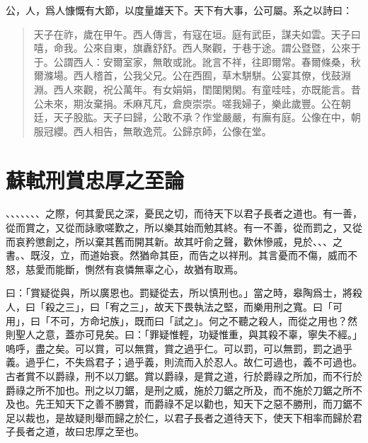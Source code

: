 公，人，爲人慷慨有大節，以度量雄天下。天下有大事，公可屬。系之以詩曰：

\begin{quote}
    天子在祚，歲在甲午。西人傳言，有寇在垣。庭有武臣，謀夫如雲。天子曰嘻，命我。公來自東，旗纛舒舒。西人聚觀，于巷于途。謂公暨暨，公來于于。公謂西人：安爾室家，無敢或訛。訛言不祥，往即爾常。春爾條桑，秋爾滌場。西人稽首，公我父兄。公在西囿，草木駢駢。公宴其僚，伐鼓淵淵。西人來觀，祝公萬年。有女娟娟，閨闥閑閑。有童哇哇，亦既能言。昔公未來，期汝棄捐。禾麻芃芃，倉庾崇崇。嗟我婦子，樂此歲豐。公在朝廷，天子股肱。天子曰歸，公敢不承？作堂嚴嚴，有廡有庭。公像在中，朝服冠纓。西人相告，無敢逸荒。公歸京師，公像在堂。
\end{quote}
\vspace{-1em}
\theendnotes

\section[刑賞忠厚之至論\quad{\small 蘇軾}]{{\normalsize 蘇軾}\quad 刑賞忠厚之至論}
、、、、、、、之際，何其愛民之深，憂民之切，而待天下以君子長者之道也。有一善，從而賞之，又從而詠歌嗟歎之，所以樂其始而勉其終。有一不善，從而罰之，又從而哀矜懲創之，所以棄其舊而開其新。故其吁俞之聲，歡休慘戚，見於、、、之書。、既沒，立，而道始衰。然猶命其臣，而告之以祥刑。其言憂而不傷，威而不怒，慈愛而能斷，惻然有哀憐無辜之心，故猶有取焉。

曰：「賞疑從與，所以廣恩也。罰疑從去，所以慎刑也。」當之時，皋陶爲士，將殺人，曰「殺之三」，曰「宥之三」，故天下畏執法之堅，而樂用刑之寬。曰「可用」，曰「不可，方命圮族」，既而曰「試之」。何之不聽之殺人，而從之用也？然則聖人之意，蓋亦可見矣。曰：「罪疑惟輕，功疑惟重，與其殺不辜，寧失不經。」嗚呼，盡之矣。可以賞，可以無賞，賞之過乎仁。可以罰，可以無罰，罰之過乎義。過乎仁，不失爲君子；過乎義，則流而入於忍人。故仁可過也，義不可過也。古者賞不以爵祿，刑不以刀鋸。賞以爵祿，是賞之道，行於爵祿之所加，而不行於爵祿之所不加也。刑之以刀鋸，是刑之威，施於刀鋸之所及，而不施於刀鋸之所不及也。先王知天下之善不勝賞，而爵祿不足以勸也，知天下之惡不勝刑，而刀鋸不足以裁也，是故疑則舉而歸之於仁，以君子長者之道待天下，使天下相率而歸於君子長者之道，故曰忠厚之至也。

